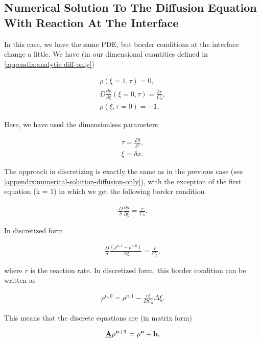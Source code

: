 \subsection{Numerical Solution To The Diffusion Equation With Reaction At The Interface}


In this case, we have the same PDE, but border conditions at the interface change a little. We have (in our dimensional cuantities defined in \ref{appendix:analytic-diff-only})

\begin{align}
	\rho(\xi = 1, \tau) = 0, \\
	D \frac{\partial \rho}{\partial \xi} (\xi = 0, \tau) = \frac{\delta r}{C_b},\\
	\rho(\xi, \tau = 0) = -1.
\end{align}

Here, we have used the dimensionless parameters 

\begin{align}
    \tau = \frac{D t }{\delta ^2},\\
    \xi = \delta x.
\end{align}


The approach in discretizing is exactly the same as in the previous case (see \ref{appendix:numerical-solution-diffusion-only}), with the exception of the first equation (k = 1) in which we get the following border condition

\begin{align}
    \frac{D}{\delta}\frac{\partial \rho}{\partial \xi} = \frac{r}{C_b}.
\end{align}

In discretized form

\begin{align}
    \frac{D}{\delta}\frac{(\rho^{n,1}-\rho^{n,0})}{\Delta \xi} = \frac{r}{C_b},
\end{align}

where $r$ is the reaction rate. In discretized form, this border condition can be written as

\begin{align}
    \rho^{n,0} = \rho^{n,1} - \frac{r\delta }{D C_b}\Delta \xi.
\end{align}


This means that the discrete equations are (in matrix form)

\begin{align}
    \bf{\underline{A}} \bf{\rho^{n+1}}  = \bf{\rho^n} + \bf{b},
\end{align}

